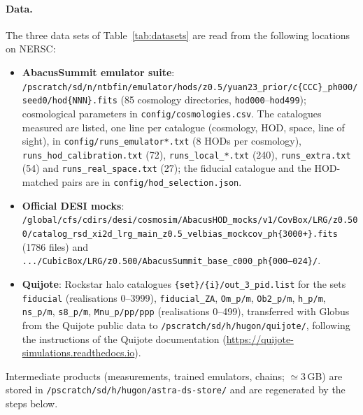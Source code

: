 \documentclass[11pt,twocolumn]{article}
\begin{document}
\paragraph{Data.} The three data sets of Table~\ref{tab:datasets} are read from the following locations on NERSC:
\begin{itemize}
\item \textbf{AbacusSummit emulator suite}: \texttt{/pscratch/sd/n/ntbfin/emulator/hods/z0.5/yuan23\_prior/c\{CCC\}\_ph000/seed0/hod\{NNN\}.fits} (85 cosmology directories, \texttt{hod000}--\texttt{hod499}); cosmological parameters in \texttt{config/cosmologies.csv}. The catalogues measured are listed, one line per catalogue (cosmology, HOD, space, line of sight), in \texttt{config/runs\_emulator*.txt} (8 HODs per cosmology), \texttt{runs\_hod\_calibration.txt} (72), \texttt{runs\_local\_*.txt} (240), \texttt{runs\_extra.txt} (54) and \texttt{runs\_real\_space.txt} (27); the fiducial catalogue and the HOD-matched pairs are in \texttt{config/hod\_selection.json}.
\item \textbf{Official DESI mocks}: \texttt{/global/cfs/cdirs/desi/cosmosim/AbacusHOD\_mocks/v1/CovBox/LRG/z0.500/catalog\_rsd\_xi2d\_lrg\_main\_z0.5\_velbias\_mockcov\_ph\{3000+\}.fits} (1786 files) and \texttt{.../CubicBox/LRG/z0.500/AbacusSummit\_base\_c000\_ph\{000--024\}/}.
\item \textbf{Quijote}: Rockstar halo catalogues \texttt{\{set\}/\{i\}/out\_3\_pid.list} for the sets \texttt{fiducial} (realisations 0--3999), \texttt{fiducial\_ZA}, \texttt{Om\_p/m}, \texttt{Ob2\_p/m}, \texttt{h\_p/m}, \texttt{ns\_p/m}, \texttt{s8\_p/m}, \texttt{Mnu\_p/pp/ppp} (realisations 0--499), transferred with Globus from the Quijote public data to \texttt{/pscratch/sd/h/hugon/quijote/}, following the instructions of the Quijote documentation (\url{https://quijote-simulations.readthedocs.io}).
\end{itemize}
Intermediate products (measurements, trained emulators, chains; $\simeq3$\,GB) are stored in \texttt{/pscratch/sd/h/hugon/astra-ds-store/} and are regenerated by the steps below.
\end{document}
